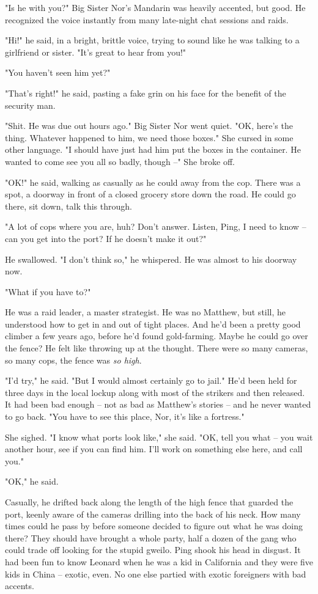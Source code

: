 "Is he with you?" Big Sister Nor's Mandarin was heavily accented,
but good. He recognized the voice instantly from many late-night
chat sessions and raids.

"Hi!" he said, in a bright, brittle voice, trying to sound like he
was talking to a girlfriend or sister. "It's great to hear from
you!"

"You haven't seen him yet?"

"That's right!" he said, pasting a fake grin on his face for the
benefit of the security man.

"Shit. He was due out hours ago." Big Sister Nor went quiet. "OK,
here's the thing. Whatever happened to him, we need those boxes."
She cursed in some other language. "I should have just had him put
the boxes in the container. He wanted to come see you all so badly,
though --" She broke off.

"OK!" he said, walking as casually as he could away from the cop.
There was a spot, a doorway in front of a closed grocery store down
the road. He could go there, sit down, talk this through.

"A lot of cops where you are, huh? Don't answer. Listen, Ping, I
need to know -- can you get into the port? If he doesn't make it
out?"

He swallowed. "I don't think so," he whispered. He was almost to
his doorway now.

"What if you have to?"

He was a raid leader, a master strategist. He was no Matthew, but
still, he understood how to get in and out of tight places. And
he'd been a pretty good climber a few years ago, before he'd found
gold-farming. Maybe he could go over the fence? He felt like
throwing up at the thought. There were so many cameras, so many
cops, the fence was \emph{so high}.

"I'd try," he said. "But I would almost certainly go to jail." He'd
been held for three days in the local lockup along with most of the
strikers and then released. It had been bad enough -- not as bad as
Matthew's stories -- and he never wanted to go back. "You have to
see this place, Nor, it's like a fortress."

She sighed. "I know what ports look like," she said. "OK, tell you
what -- you wait another hour, see if you can find him. I'll work
on something else here, and call you."

"OK," he said.

Casually, he drifted back along the length of the high fence that
guarded the port, keenly aware of the cameras drilling into the
back of his neck. How many times could he pass by before someone
decided to figure out what he was doing there? They should have
brought a whole party, half a dozen of the gang who could trade off
looking for the stupid gweilo. Ping shook his head in disgust. It
had been fun to know Leonard when he was a kid in California and
they were five kids in China -- exotic, even. No one else partied
with exotic foreigners with bad accents.

